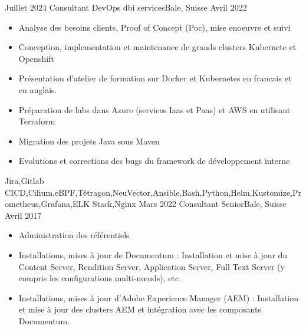%
%
%

\begin{experiences}
  \experience
    {Juillet 2024}   {Consultant DevOps }{dbi services}{Bale, Suisse}
    {Avril 2022} {
                      \begin{itemize}
                        \item Analyse des besoins clients, Proof of Concept (Poc), mise enoeuvre et suivi
                        \item Conception, implementation et maintenance de grands clusters Kubernete et Openshift
                        \item Présentation d’atelier de formation sur Docker et Kubernetes en francais et en anglais.
                        \item Préparation de labs dans Azure (services Iaas et Paas) et AWS en utilisant Terraform
                        \item Migration des projets Java sous Maven
                        \item Evolutions et corrections des bugs du framework de développement interne  
                      \end{itemize}
                    }
                    {Jira,Gitlab CICD,Cilium,eBPF,Tétragon,NeuVector,Ansible,Bash,Python,Helm,Kustomize,Prometheus,Grafana,ELK Stack,Nginx}
  \emptySeparator
  \experience
    {Mars 2022} {Consultant Senior}{}{Bale, Suisse}
    {Avril 2017}    {
                      \begin{itemize}
                        \item Administration des référentiels                           
                        \item Installations, mises à jour de Documentum : Installation et mise à jour du Content Server, Rendition Server, Application Server, Full Text Server (y compris les configurations multi-nœuds), etc.                        
                        \item Installations, mises à jour d'Adobe Experience Manager (AEM) : Installation et mise à jour des clusters AEM et intégration avec les composants Documentum.  

\end{itemize}}
\end{experiences}
